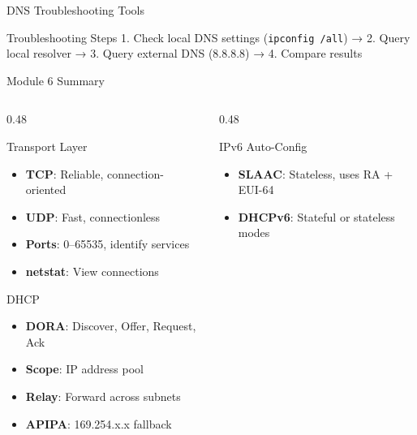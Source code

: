 \documentclass[aspectratio=169, 11pt]{beamer}
\begin{document}
\begin{frame}{DNS Troubleshooting Tools}
    \vspace{0.3em}
    \begin{exampleblock}{Troubleshooting Steps}
        \small
        1. Check local DNS settings (\texttt{ipconfig /all}) → 
        2. Query local resolver → 
        3. Query external DNS (8.8.8.8) → 
        4. Compare results
    \end{exampleblock}
\end{frame}

\begin{frame}{Module 6 Summary}
    \begin{columns}[T]
        \begin{column}{0.48\textwidth}
            \begin{block}{Transport Layer}
                \small
                \begin{itemize}\setlength{\itemsep}{1pt}
                    \item \textbf{TCP}: Reliable, connection-oriented
                    \item \textbf{UDP}: Fast, connectionless
                    \item \textbf{Ports}: 0--65535, identify services
                    \item \textbf{netstat}: View connections
                \end{itemize}
            \end{block}
            
            \vspace{0.2em}
            \begin{block}{DHCP}
                \small
                \begin{itemize}\setlength{\itemsep}{1pt}
                    \item \textbf{DORA}: Discover, Offer, Request, Ack
                    \item \textbf{Scope}: IP address pool
                    \item \textbf{Relay}: Forward across subnets
                    \item \textbf{APIPA}: 169.254.x.x fallback
                \end{itemize}
            \end{block}
        \end{column}
        \begin{column}{0.48\textwidth}
            \begin{block}{IPv6 Auto-Config}
                \small
                \begin{itemize}\setlength{\itemsep}{1pt}
                    \item \textbf{SLAAC}: Stateless, uses RA + EUI-64
                    \item \textbf{DHCPv6}: Stateful or stateless modes
                \end{itemize}
            \end{block}
            

\end{column}
\end{columns}
\end{frame}
\end{document}
